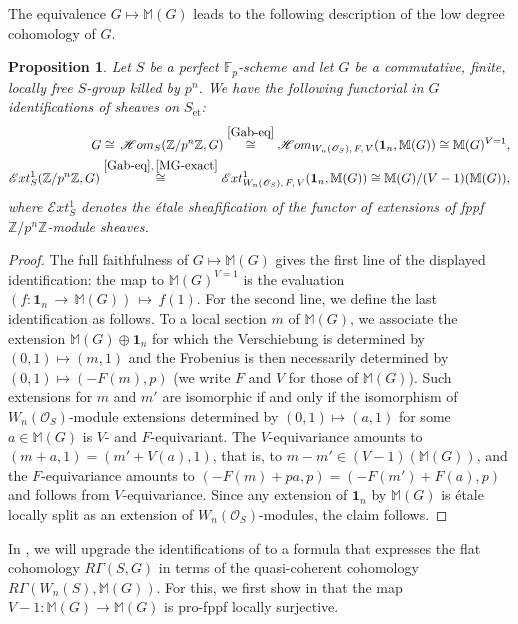 \documentclass[11pt, reqno]{amsart}
\newcommand{\bF}{\mathbb{F}}
\newcommand{\bM}{\mathbb{M}}
\newcommand{\bZ}{\mathbb{Z}}
\newcommand{\sE}{\mathscr{E}}
\newcommand{\sH}{\mathscr{H}}
\newcommand{\sO}{\mathscr{O}}
\newcommand{\et}{\mathrm{\acute{e}t}}	%
\newcommand{\ra}{\rightarrow}
\providecommand{\uref}[1]{{\upshape\ref{#1}}}
\providecommand{\uS}{{\upshape\S}}
\providecommand{\ucolon}{{\upshape:} }
\newcommand{\ba}{\begin{aligned}}
\newcommand{\ea}{\end{aligned}}
\newcommand{\bpf}{\begin{proof}}
\newcommand{\epf}{\end{proof}}
\newcommand{\bprop}{\begin{prop}}
\newcommand{\eprop}{\end{prop}}
\numberwithin{equation}{numberingbase}
\theoremstyle{thms}
\newtheorem{prop}[numberingbase]{Proposition}
\theoremstyle{claims}
\theoremstyle{defs}
\theoremstyle{thms}
\theoremstyle{defs}
\theoremstyle{subsection-tweak}
\theoremstyle{subsection-tweak}
\newcommand{\bb}{\boldsymbol}		%
\begin{document}
The equivalence $G \mapsto \bM(G)$ leads to the following description of the low degree cohomology of $G$. 

\bprop \label{lem:syntomic-low-coh-id}
Let $S$ be a perfect $\bF_p$-scheme and let $G$ be a commutative, finite, locally free $S$-group killed by $p^n$. 
 We have the following functorial in $G$ identifications of sheaves on $S_\et$\ucolon
\[\ba \label{H0-cris-id} %
G\cong \,\sH om_S(\bZ/p^n\bZ, G) \overset{\ref{Gab-eq}}{\cong}  \sH om_{W_n(\sO_S),\,F,\, V}(\bb1_n, \bM(G)) \cong \bM(G)^{V = 1}, \\
\sE xt^1_S(\bZ/p^n\bZ, G) \overset{\ref{Gab-eq},\, \ref{MG-exact}}{\cong}  \sE xt^1_{W_n(\sO_S),\, F,\, V}(\bb1_n, \bM(G)) \cong \bM(G)/(V - 1)(\bM(G)),
\ea \]
where $\sE xt^1_S$ denotes the \'{e}tale sheafification of the functor of extensions of fppf $\bZ/p^n\bZ$-module sheaves.
\eprop

\bpf
The full faithfulness of $G \mapsto \bM(G)$ gives the first line of the displayed identification: the map to $\bM(G)^{V = 1}$ is the evaluation $(f \colon \bb1_n\, \ra\, \bM(G))\, \mapsto\, f(1)$. For the second line, we define the last identification as follows. To a local section $m$ of $\bM(G)$, we associate the extension $\bM(G) \oplus \bb1_n$ for which the Verschiebung is determined by $(0, 1) \mapsto (m, 1)$ and the Frobenius is then necessarily determined by $(0, 1) \mapsto (-F(m), p)$ (we write $F$ and $V$ for those of $\bM(G)$). Such extensions for $m$ and $m'$ are isomorphic if and only if the isomorphism of $W_n(\sO_S)$-module extensions determined by $(0, 1) \mapsto (a, 1)$ for some $a \in \bM(G)$ is $V$- and $F$-equivariant. The $V$-equivariance amounts to $(m + a, 1) = (m' + V(a), 1)$, that is, to $m - m' \in (V - 1)(\bM(G))$, and the $F$-equivariance amounts to $(-F(m) + pa, p) = (-F(m') + F(a), p)$ and follows from $V$-equivariance. Since any extension of $\bb1_n$ by $\bM(G)$ is \'{e}tale locally split as an extension of $W_n(\sO_S)$-modules, the claim follows.
\epf




In , we will upgrade the identifications of  to a formula that expresses the flat cohomology $R\Gamma(S, G)$ in terms of the quasi-coherent cohomology $R\Gamma(W_n(S), \bM(G))$. For this, we first show in  that the map $V - 1 \colon \bM(G) \ra \bM(G)$ is pro-fppf locally surjective.
\end{document}
